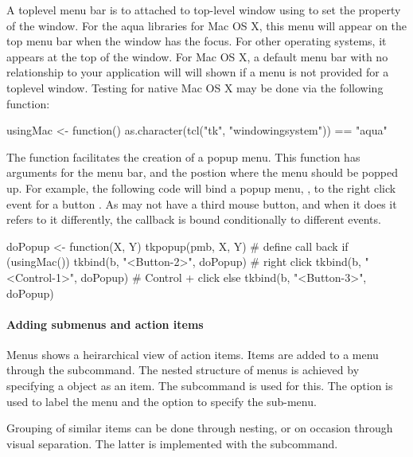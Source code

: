 A toplevel menu bar is to attached to top-level window using 
to set the  property of the window. For the aqua \TK\/
libraries for Mac OS X, this menu will appear on the top menu bar when
the window has the focus. For other operating systems, it appears at
the top of the window. For Mac OS X, a default menu bar with no
relationship to your application will will shown if a menu is not
provided for a toplevel window. Testing for native Mac OS X may be done via
the following function:
\begin{Schunk}
\begin{Sinput}
 usingMac <- function()  
   as.character(tcl("tk", "windowingsystem")) == "aqua"
\end{Sinput}
\end{Schunk}

The  function facilitates the creation of a popup
menu.  This function has arguments for the menu bar, and the postion
where the menu should be popped up. For example, the following code
will bind a popup menu, , to the right click event for a
button . As \OSX\/ may not have a third mouse button, and when
it does it refers to it differently, the callback is bound
conditionally to different events.


\begin{Schunk}
\begin{Sinput}
 doPopup <- function(X, Y) tkpopup(pmb, X, Y) # define call back
 if (usingMac()) {
   tkbind(b, "<Button-2>", doPopup)      # right click
   tkbind(b, "<Control-1>", doPopup)     # Control + click
 } else {
   tkbind(b, "<Button-3>", doPopup)
 }
\end{Sinput}
\end{Schunk}


\paragraph{Adding submenus and action items}
Menus shows a heirarchical view of action items. Items are added to a
menu through the  subcommand.  The nested
structure of menus is achieved by specifying a  object as
an item. The  subcommand is used for
this. The option  is used to label the menu and the
 option to specify the sub-menu.

Grouping of similar items can be done through nesting, or on occasion
through visual separation. The latter is implemented with the  subcommand.


